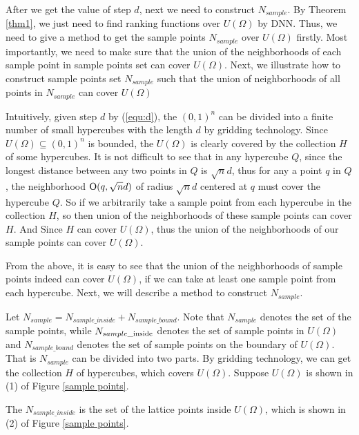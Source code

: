 After we get the value of step $d$, next we need to construct $N_{sample}$. By Theorem \ref{thm1}, we just need to find ranking functions over $U(\Omega )$ by DNN. Thus, we need to give a method to get the sample points $N_{sample}$ over $U(\Omega )$ firstly. Most importantly, we need to make sure that the union of the neighborhoods of each sample point in sample points set can cover $U(\Omega )$. Next, we illustrate how to construct sample points set $N_{sample}$ such that the union of neighborhoods of all points in $N_{sample}$ can cover $U(\Omega)$

Intuitively, given step $d$ by (\ref{equ:d}), the ${(0,1)^n}$ can be divided into a finite number of small hypercubes with the length $d$ by gridding technology. Since $U(\Omega ) \subseteq {(0,1)^n}$ is bounded, the $U(\Omega )$ is clearly covered by the collection $H$ of some hypercubes. It is not difficult to see that in any hypercube $Q$, since the longest distance between any two points in $Q$ is $\sqrt n d$, thus for any a point $q$ in $Q$, the neighborhood ${\rm O}(q,\sqrt n d)$ of radius $\sqrt n d$ centered at $q$ must cover the hypercube $Q$. So if we arbitrarily take a sample point from each hypercube in the collection $H$, so then union of the neighborhoods of these sample points can cover $H$. And Since $H$ can cover $U(\Omega )$, thus the union of the neighborhoods of our sample points can cover $U(\Omega )$. 

From the above, it is easy to see that the union of the neighborhoods of sample points indeed can cover $U(\Omega )$, if we can take at least one sample point from each hypercube. Next, we will describe a method to construct $N_{sample}$.

Let ${N_{sample}} = {N_{sample\_inside}} + {N_{sample\_bound}}$. 
Note that ${N_{sample}}$ denotes the set of the sample points, while ${N_{sample\_{\rm{inside}}}}$ denotes the set of sample points in $U(\Omega)$ and ${N_{sample\_bound}}$ denotes the set of sample points on the boundary of $U(\Omega)$. That is $N_{sample}$ can be divided into two parts.
By gridding technology, we can get the collection $H$ of hypercubes, which covers $U(\Omega)$. Suppose $U(\Omega)$ is shown in (1) of Figure \ref{sample points}. 

The $N_{sample\_inside}$ is the set of the lattice points inside $U(\Omega)$, which is shown in (2) of Figure \ref{sample points}. 

